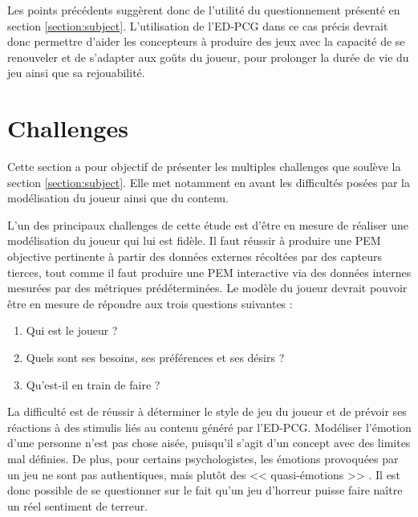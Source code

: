 \documentclass[a4paper,11pt]{article}
\begin{document}
      Les points précédents suggèrent donc de l'utilité du questionnement présenté en section \ref{section:subject}.
      L'utilisation de l'ED-PCG dans ce cas précis devrait donc permettre d'aider les concepteurs à produire des jeux avec la capacité de se renouveler et de s'adapter aux goûts du joueur, pour prolonger la durée de vie du jeu ainsi que sa rejouabilité.

    \section{Challenges}\label{section:challenges}
      
      Cette section a pour objectif de présenter les multiples challenges que soulève la section \ref{section:subject}.
      Elle met notamment en avant les difficultés posées par la modélisation du joueur ainsi que du contenu.
     
      L'un des principaux challenges de cette étude est d'être en mesure de réaliser une modélisation du joueur qui lui est fidèle.
      Il faut réussir à produire une PEM objective pertinente à partir des données externes récoltées par des capteurs tierces, tout comme il faut produire une PEM interactive via des données internes mesurées par des métriques prédéterminées.
      Le modèle du joueur devrait pouvoir être en mesure de répondre aux trois questions suivantes \cite{Bakkes} :

      \begin{enumerate}
        \vspace{-1em}
        \item Qui est le joueur ?
        \vspace{-0.8em}
        \item Quels sont ses besoins, ses préférences et ses désirs ?
        \vspace{-0.8em}
        \item Qu'est-il en train de faire ?
        \vspace{-1em}
      \end{enumerate}

      La difficulté est de réussir à déterminer le style de jeu du joueur et de prévoir ses réactions à des stimulis liés au contenu généré par l'ED-PCG.
      Modéliser l'émotion d'une personne n'est pas chose aisée, puisqu'il s'agit d'un concept avec des limites mal définies. 
      De plus, pour certains psychologistes, les émotions provoquées par un jeu ne sont pas authentiques, mais plutôt des << quasi-émotions >> \cite{Walton}. 
      Il est donc possible de se questionner sur le fait qu'un jeu d'horreur puisse faire naître un réel sentiment de terreur.
\end{document}
